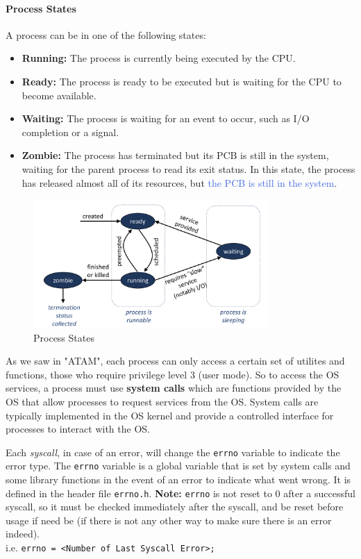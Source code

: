 \documentclass[openany,12pt]{book}
\newcommand{\code}[1]{\texttt{#1}}
\newcommand{\blue}[1]{\textcolor{RoyalBlue}{#1}}
\begin{document}
\paragraph{Process States}
A process can be in one of the following states:
\begin{itemize}
    \item \textbf{Running:} The process is currently being executed by the CPU.
    \item \textbf{Ready:} The process is ready to be executed but is waiting for the CPU to become available.
    \item \textbf{Waiting:} The process is waiting for an event to occur, such as I/O completion or a signal.
    \item \textbf{Zombie:} The process has terminated but its PCB is still in the system, waiting for the parent process to read its exit status. In this state, the process has released almost all of its resources, but \blue{the PCB is still in the system}.
\end{itemize}



\begin{figure}
    \centering
    \includegraphics[width=0.8\textwidth]{../Assets/process_states.png}
    \caption{Process States}
    \label{fig:process_states}
\end{figure}


As we saw in "ATAM", each process can only access a certain set of utilites and functions, those who require privilege level 3 (user mode). So to access the OS services, a process must use \textbf{system calls} which are functions provided by the OS that allow processes to request services from the OS. System calls are typically implemented in the OS kernel and provide a controlled interface for processes to interact with the OS.

\vspace{1em}

Each \textit{syscall}, in case of an error, will change the \texttt{errno} variable to indicate the error type. The \texttt{errno} variable is a global variable that is set by system calls and some library functions in the event of an error to indicate what went wrong. It is defined in the header file \texttt{errno.h}. {\color{blue}\textbf{Note:} \texttt{errno} is not reset to 0 after a successful syscall, so it must be checked immediately after the syscall, and be reset before usage if need be} (if there is not any other way to make sure there is an error indeed).\\
i.e. \code{errno = <Number of Last Syscall Error>;}
\end{document}
